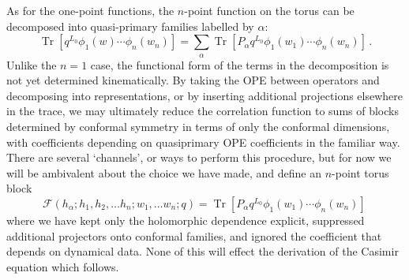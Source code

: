 \documentclass[12pt]{article}
\DeclareMathOperator{\Tr}{Tr}
\begin{document}
As for the one-point functions, the $n$-point function on the torus can be decomposed into quasi-primary families labelled by $\alpha$:
\begin{equation}
 \Tr \left[ q^{L_0}\phi_1(w)\cdots \phi_n(w_n)\right]
=\sum_{\alpha}
\Tr \left[ P_{\alpha}q^{L_0}\phi_1(w_1)\cdots \phi_n(w_n)\right]\,.
\end{equation}
Unlike the $n=1$ case, the functional form of the terms in the decomposition is not yet determined kinematically. By taking the OPE between operators and decomposing into representations, or by inserting additional projections elsewhere in the trace, we may ultimately reduce the correlation function to sums of blocks determined by conformal symmetry in terms of only the conformal dimensions, with coefficients depending on quasiprimary OPE coefficients in the familiar way. There are several `channels', or ways to perform this procedure, but for now we will be ambivalent about the choice we have made, and define an $n$-point torus block
\begin{equation}
\mathcal{F}
(h_{\alpha};h_1,h_2,\ldots h_n;w_1,\ldots w_n;q)
=
\Tr \left[ P_{\alpha}q^{L_0}\phi_1(w_1)\cdots \phi_n(w_n)\right]\,
\end{equation}
where we have kept only the holomorphic dependence explicit, suppressed additional projectors onto conformal families, and ignored the coefficient that depends on dynamical data. None of this will effect the derivation of the Casimir equation which follows.
\end{document}
